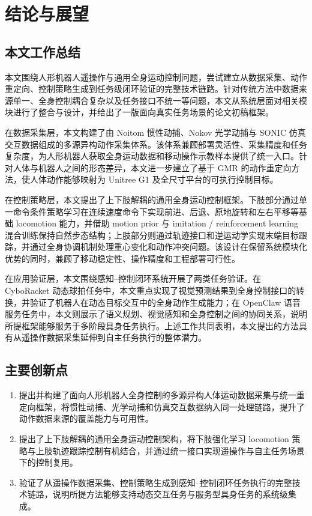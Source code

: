 
\chapter{结论与展望}

\section{本文工作总结}

本文围绕人形机器人遥操作与通用全身运动控制问题，尝试建立从数据采集、动作重定向、控制策略生成到任务级闭环验证的完整技术链路。针对传统方法中数据来源单一、全身控制耦合复杂以及任务接口不统一等问题，本文从系统层面对相关模块进行了整合与设计，并给出了一版面向真实任务场景的论文初稿框架。

在数据采集层，本文构建了由 Noitom 惯性动捕、Nokov 光学动捕与 SONIC 仿真交互数据组成的多源异构动作采集体系。该体系兼顾部署灵活性、采集精度和任务复杂度，为人形机器人获取全身运动数据和移动操作示教样本提供了统一入口。针对人体与机器人之间的形态差异，本文进一步建立了基于 GMR 的动作重定向方法，使人体动作能够映射为 Unitree G1 及全尺寸平台的可执行控制目标。

在控制策略层，本文提出了上下肢解耦的通用全身运动控制框架。下肢部分通过单一命令条件策略学习在连续速度命令下实现前进、后退、原地旋转和左右平移等基础 locomotion 能力，并借助 motion prior 与 imitation / reinforcement learning 混合训练保持自然步态结构；上肢部分则通过轨迹接口和逆运动学实现末端目标跟踪，并通过全身协调机制处理重心变化和动作冲突问题。该设计在保留系统模块化优势的同时，兼顾了移动稳定性、操作精度和工程部署可行性。

在应用验证层，本文围绕感知--控制闭环系统开展了两类任务验证。在 CyboRacket 动态球拍任务中，本文重点实现了视觉预测结果到全身控制接口的转换，并验证了机器人在动态目标交互中的全身动作生成能力；在 OpenClaw 语音服务任务中，本文则展示了语义规划、视觉感知和全身控制之间的协同关系，说明所提框架能够服务于多阶段具身任务执行。上述工作共同表明，本文提出的方法具有从遥操作数据采集延伸到自主任务执行的整体潜力。

\section{主要创新点}

\begin{enumerate}
  \item 提出并构建了面向人形机器人全身控制的多源异构人体运动数据采集与统一重定向框架，将惯性动捕、光学动捕和仿真交互数据纳入同一处理链路，提升了动作数据来源的覆盖能力与可用性。

  \item 提出了上下肢解耦的通用全身运动控制架构，将下肢强化学习 locomotion 策略与上肢轨迹跟踪控制有机结合，并通过统一接口实现遥操作与自主任务场景下的控制复用。

  \item 验证了从遥操作数据采集、控制策略生成到感知--控制闭环任务执行的完整技术链路，说明所提方法能够支持动态交互任务与服务型具身任务的系统级集成。
\end{enumerate}


